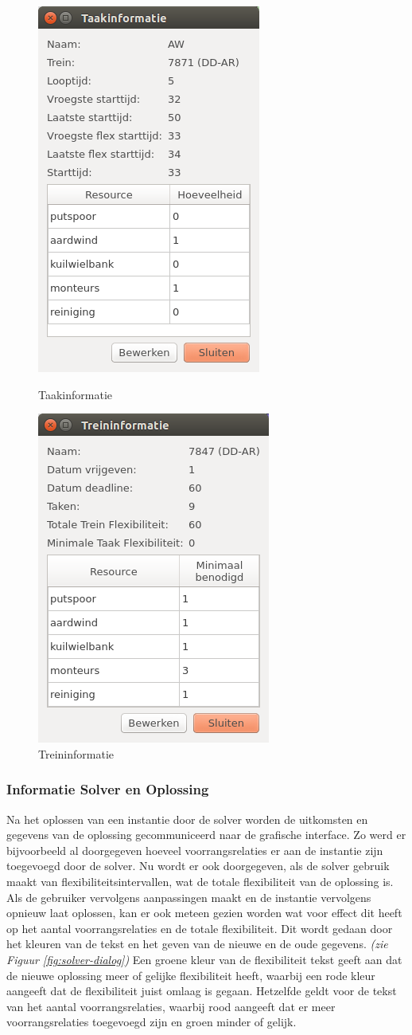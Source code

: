 \begin{figure}[H]
\parbox{.45\linewidth}{
    \center
    \includegraphics[width=.4\textwidth]{../images/taak-info.png}
    \caption{Taakinformatie}
    \label{fig:taak-info}
}\hfill
\parbox{.45\linewidth}{
    \center
    \includegraphics[width=.4\textwidth]{../images/trein-info.png}
    \caption{Treininformatie}
    \label{fig:trein-info}
}
\end{figure}

\subsubsection{Informatie Solver en Oplossing}
Na het oplossen van een instantie door de solver worden de uitkomsten en gegevens van de oplossing gecommuniceerd naar de grafische interface. Zo werd er bijvoorbeeld al doorgegeven hoeveel voorrangsrelaties er aan de instantie zijn toegevoegd door de solver. Nu wordt er ook doorgegeven, als de solver gebruik maakt van flexibiliteitsintervallen, wat de totale flexibiliteit van de oplossing is. Als de gebruiker vervolgens aanpassingen maakt en de instantie vervolgens opnieuw laat oplossen, kan er ook meteen gezien worden wat voor effect dit heeft op het aantal voorrangsrelaties en de totale flexibiliteit. Dit wordt gedaan door het kleuren van de tekst en het geven van de nieuwe en de oude gegevens. \emph{(zie Figuur \ref{fig:solver-dialog})} Een groene kleur van de flexibiliteit tekst geeft aan dat de nieuwe oplossing meer of gelijke flexibiliteit heeft, waarbij een rode kleur aangeeft dat de flexibiliteit juist omlaag is gegaan. Hetzelfde geldt voor de tekst van het aantal voorrangsrelaties, waarbij rood aangeeft dat er meer voorrangsrelaties toegevoegd zijn en groen minder of gelijk.

